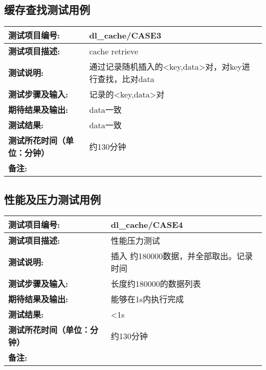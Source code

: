 \subsection {缓存查找测试用例}
\begin{table}[H]
\centering
\begin{tabular}{|p{8em}|p{22em}|}
\hline
\textbf{测试项目编号:}&dl\_cache/CASE3\\
\hline
\textbf{测试项目描述:}&cache retrieve\\
\hline
\textbf{测试说明:}&通过记录随机插入的<key,data>对，对key进行查找，比对data\\
\hline
\textbf{测试步骤及输入:}&记录的<key,data>对\\
\hline
\textbf{期待结果及输出:}&data一致\\
\hline
\textbf{测试结果:}&data一致\\
\hline
\textbf{测试所花时间（单位：分钟）}& 约130分钟\\
\hline
\textbf{备注:}& \\
\hline
\end{tabular}
\end{table}


\subsection{性能及压力测试用例}
\begin{table}[H]
\centering
\begin{tabular}{|p{8em}|p{22em}|}
\hline
\textbf{测试项目编号:}&dl\_cache/CASE4\\
\hline
\textbf{测试项目描述:}&性能压力测试\\
\hline
\textbf{测试说明:}&插入 约180000数据，并全部取出。记录时间\\
\hline
\textbf{测试步骤及输入:}&长度约180000的数据列表\\
\hline
\textbf{期待结果及输出:}&能够在1s内执行完成\\
\hline
\textbf{测试结果:}& <1s\\
\hline
\textbf{测试所花时间（单位：分钟）}& 约130分钟\\
\hline
\textbf{备注:}& \\
\hline
\end{tabular}
\end{table}


